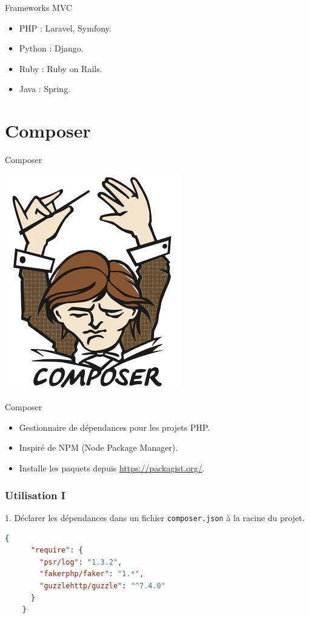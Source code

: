 \documentclass{beamer}
\begin{document}
\begin{frame}{Frameworks MVC}
  \begin{itemize}
    \item PHP : Laravel, Symfony.
    \item Python : Django.
    \item Ruby : Ruby on Rails.
    \item Java : Spring.
  \end{itemize}
\end{frame}

\section{Composer}
\begin{frame}{Composer}
\begin{center}
  \includegraphics[scale=1.5]{images/composer.png}
\end{center}
\end{frame}

\begin{frame}{Composer}
\begin{itemize}
  \item Gestionnaire de dépendances pour les projets PHP.
  \item Inspiré de NPM (Node Package Manager).
  \item Installe les paquets depuis \url{https://packagist.org/}.
\end{itemize}
\end{frame}

\begin{frame}[fragile]
\frametitle{Utilisation I}
  1. Déclarer les dépendances dans un fichier \texttt{composer.json} à la racine du projet.
  \begin{lstlisting}[language=json]
    {
      "require": {
        "psr/log": "1.3.2",
        "fakerphp/faker": "1.*",
        "guzzlehttp/guzzle": "^7.4.0"
      }
    }
  \end{lstlisting}
\end{frame}
\end{document}
